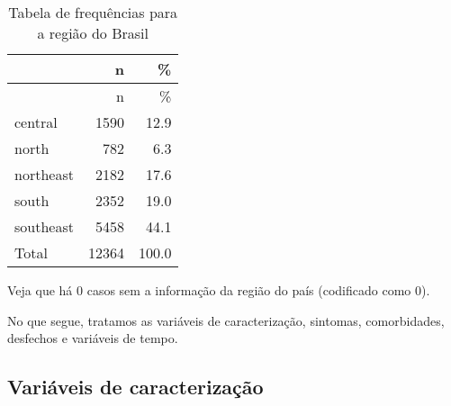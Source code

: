 \documentclass[
]{article}
\newenvironment{Shaded}{\begin{snugshade}}{\end{snugshade}}
\newcommand{\AttributeTok}[1]{\textcolor[rgb]{0.77,0.63,0.00}{#1}}
\newcommand{\CommentTok}[1]{\textcolor[rgb]{0.56,0.35,0.01}{\textit{#1}}}
\newcommand{\ConstantTok}[1]{\textcolor[rgb]{0.00,0.00,0.00}{#1}}
\newcommand{\DecValTok}[1]{\textcolor[rgb]{0.00,0.00,0.81}{#1}}
\newcommand{\FunctionTok}[1]{\textcolor[rgb]{0.00,0.00,0.00}{#1}}
\newcommand{\NormalTok}[1]{#1}
\newcommand{\SpecialCharTok}[1]{\textcolor[rgb]{0.00,0.00,0.00}{#1}}
\newcommand{\StringTok}[1]{\textcolor[rgb]{0.31,0.60,0.02}{#1}}
\begin{document}
\begin{Shaded}
\end{Shaded}

\begin{longtable}[]{@{}lrr@{}}
\caption{Tabela de frequências para a região do Brasil}\tabularnewline
\toprule
& n & \% \\
\midrule
\endfirsthead
\toprule
& n & \% \\
\midrule
\endhead
central & 1590 & 12.9 \\
north & 782 & 6.3 \\
northeast & 2182 & 17.6 \\
south & 2352 & 19.0 \\
southeast & 5458 & 44.1 \\
Total & 12364 & 100.0 \\
\bottomrule
\end{longtable}

Veja que há 0 casos sem a informação da região do país (codificado como
0).

No que segue, tratamos as variáveis de caracterização, sintomas,
comorbidades, desfechos e variáveis de tempo.

\hypertarget{variuxe1veis-de-caracterizauxe7uxe3o}{%
\subsection{Variáveis de
caracterização}\label{variuxe1veis-de-caracterizauxe7uxe3o}}
\end{document}
